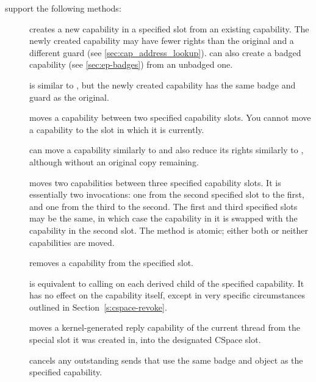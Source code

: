  support the following methods:
\begin{description}
\item[] creates a new
  capability in a specified  slot from an existing
  capability.  The newly created capability may have fewer rights than
  the original and a different guard (see
  \autoref{sec:cap_address_lookup}). 
  can also create a badged capability (see \autoref{sec:ep-badges})
  from an unbadged one.
\item[] is similar to
  , but the newly created
  capability has the same badge and guard as the original.
\item[] moves a capability
  between two specified capability slots. You cannot move a capability
  to the slot in which it is currently.
\item[] can move a
  capability similarly to  and
  also reduce its rights similarly to
  , although without an
  original copy remaining.
\item[] moves two
  capabilities between three specified capability slots. It is
  essentially two  invocations:
  one from the second specified slot to the first, and one from the
  third to the second. The first and third specified slots may be the
  same, in which case the capability in it is swapped with the
  capability in the second slot. The method is atomic; either both or
  neither capabilities are moved.
\item[] removes a
  capability from the specified slot.
\item[] is equivalent to
  calling  on each derived
  child of the specified capability. It has no effect on the
  capability itself, except in very specific circumstances outlined
  in Section~\ref{s:cspace-revoke}.
\item[] moves a
  kernel-generated reply capability of the current thread from the
  special  slot it was created in, into the designated CSpace
  slot.
\item[] cancels
  any outstanding sends that use the same badge and object as the
  specified capability.
\end{description}


